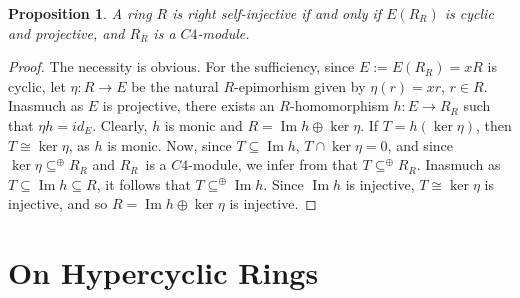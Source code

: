 \documentclass{amsart}
\theoremstyle{plain}
\newtheorem{proposition}[theorem]{Proposition}
\numberwithin{equation}{section}
\begin{document}
\begin{proposition}
\label{E(R) cyclic implies Injective VIII}
A ring $R$ is right self-injective if and only if $E (R_{R})$ is cyclic and projective, and $R_{R}$ is a $C 4$-module. 
\end{proposition}


\begin{proof}
The necessity is obvious. For the sufficiency, since $E:=E (R_{R}) =x R$ is cyclic, let $\eta  :R \rightarrow E$ be the natural $R$-epimorhism given by $\eta  (r) =x r$, $r \in R$. Inasmuch as $E$ is projective, there exists an $R$-homomorphism $h :E \rightarrow R_{R}$ such that $\eta  h =i d_{E}$. Clearly, $h$ is monic and $R =\ensuremath{\operatorname*{Im}}h \oplus \ker  \eta $. If $T =h (\ker \eta )$, then $T \cong \ker \eta $, as $h$ is monic. Now, since $T \subseteq \ensuremath{\operatorname*{Im}}h$, $T \cap \ker  \eta  =0$, and since $\ker \eta   \subseteq ^{ \oplus }R_{R}$ and $R_{R}$\ is a $C 4$-module, we infer from \cite[Theorem 2.2]{DIYZ 2}
that $T  \subseteq ^{ \oplus }R_{R}$. Inasmuch as $T \subseteq \ensuremath{\operatorname*{Im}}h \subseteq R$, it follows that $T  \subseteq ^{ \oplus }\ensuremath{\operatorname*{Im}}h$. Since $\ensuremath{\operatorname*{Im}}h$ is injective, $T \cong \ker \eta $ is injective, and so $R =\ensuremath{\operatorname*{Im}}h \oplus \ker  \eta $ is injective. 
\end{proof}

\section{On Hypercyclic Rings}

%
\end{document}
